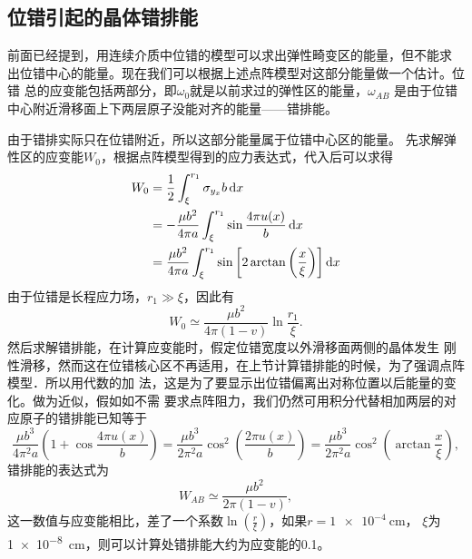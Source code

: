             \subsection{位错引起的晶体错排能}
                前面已经提到，用连续介质中位错的模型可以求出弹性畸变区的能量，但不能求
                出位错中心的能量。现在我们可以根据上述点阵模型对这部分能量做一个估计。位错
                总的应变能包括两部分，即$\omega_0$就是以前求过的弹性区的能量，$\omega_{AB}$
                是由于位错中心附近滑移面上下两层原子没能对齐的能量——错排能。

                由于错排实际只在位错附近，所以这部分能量属于位错中心区的能量。
                先求解弹性区的应变能$W_0$，根据点阵模型得到的应力表达式，代入后可以求得
                \begin{equation}
                    \begin{aligned}
                        W_{0}&=\frac{1}{2} \int_{\xi}^{r_{1}} \sigma_{y_{x}} b \mathop{}\!\mathrm{d} x\\
                        &=-\frac{\mu b^{2}}{4 \pi a} \int_{\xi}^{r_{1}} \sin \frac{4 \pi u(x)}{b} \mathop{}\!\mathrm{d} x\\
                        &=\frac{\mu b^{2}}{4 \pi a} \int_{\xi}^{r_{1}} \sin \left[2 \arctan\left(\frac{x}{\xi}\right)\right] \mathop{}\!\mathrm{d} x
                    \end{aligned}
                \end{equation}
                由于位错是长程应力场，$r_1\gg\xi$，因此有
                \begin{equation}
                    W_0\simeq\frac{\mu b^2}{4\pi(1-v)}\ln\frac{r_1}{\xi}.
                \end{equation}
                然后求解错排能，在计算应变能时，假定位错宽度以外滑移面两侧的晶体发生
                刚性滑移，然而这在位错核心区不再适用，在上节计算错排能的时候，为了强调点阵模型．所以用代数的加
                法，这是为了要显示出位错偏离出对称位置以后能量的变化。做为近似，假如如不需
                要求点阵阻力，我们仍然可用积分代替相加两层的对应原子的错排能已知等于
                \begin{equation}
                    \frac{\mu b^{3}}{4 \pi^{2} a}\left(1+\cos \frac{4 \pi u(x)}{b}\right)=\frac{\mu b^{3}}{2 \pi^{2} a} \cos ^{2}\left(\frac{2 \pi u(x)}{b}\right)=\frac{\mu b^{3}}{2 \pi^{2} a} \cos ^{2}\left(\arctan \frac{x}{\xi}\right),
                \end{equation}
                错排能的表达式为
                \begin{equation}
                    W_{AB}\simeq\frac{\mu b^2}{2\pi(1-v)},
                \end{equation}
                这一数值与应变能相比，差了一个系数$\ln\left( \frac{r}{\xi} \right)$，如果$r=\SI{1e-4}{\cm}$，
                $\xi$为\SI{1e-8}{\cm}，则可以计算处错排能大约为应变能的0.1。
